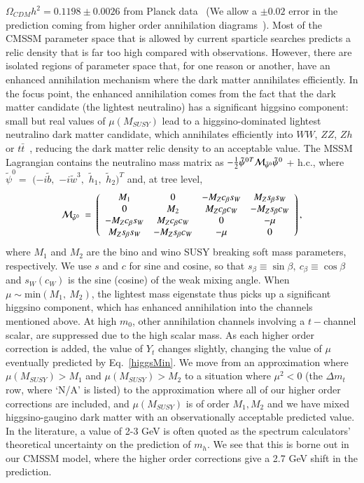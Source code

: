 \documentclass[final,3p,times,pdflatex]{elsarticle}
\begin{document}
$\Omega_{CDM} h^2=0.1198 \pm 0.0026$ from Planck data~\cite{Ade:2013zuv} (We
allow a $\pm 0.02$ error in the prediction coming from higher order
annihilation diagrams~\cite{Baro:2009na}).
Most of the CMSSM parameter space that is allowed by current sparticle
searches predicts a relic density that is far too high compared with
observations. However, there are isolated regions of parameter space that, for
one reason or another, have an enhanced annihilation mechanism where the dark
matter annihilates efficiently. In the focus point, the enhanced annihilation
comes from the fact that the dark matter candidate (the lightest neutralino)
has a significant higgsino component: small but real
values of $\mu(M_{SUSY})$ lead to a higgsino-dominated lightest neutralino dark
matter candidate, which annihilates efficiently into $WW$, $ZZ$, $Zh$ or $t
\bar t$~\cite{Feng:2000gh}, reducing the dark matter relic density to an
acceptable value. 
The MSSM Lagrangian contains the neutralino mass matrix as
$-\frac{1}{2}
{\tilde\psi^0}{}^T{\cal M}_{\tilde\psi^0}\tilde\psi^0$ + h.c., where
$\tilde\psi^0 =$ $(-i\tilde b,$ $-i\tilde w^3,$ $\tilde h_1,$ $\tilde
h_2)^T$ and, at tree level,
%
\begin{equation}
{\cal M}_{\tilde\psi^0} \ =\ \left(\begin{array}{cccc} M_1 & 0 &
-M_Zc_\beta s_W & M_Zs_\beta s_W \\ 0 & M_2 & M_Zc_\beta c_W &
-M_Zs_\beta c_W \\ -M_Zc_\beta s_W & M_Zc_\beta c_W & 0 & -\mu \\
M_Zs_\beta s_W & -M_Zs_\beta c_W & -\mu & 0
\end{array} \right),\label{mchi0}
\end{equation}
%
where $M_1$ and $M_2$ are the bino and wino SUSY breaking soft mass
parameters, respectively.
We use $s$ and $c$ for sine and cosine, so that
$s_\beta\equiv\sin\beta,\ c_{\beta}\equiv\cos\beta$ and $s_W (c_W)$ is
the sine (cosine) of the weak mixing angle. When $\mu \sim \text{min}(M_1,\
M_2)$, 
the lightest mass eigenstate thus picks up a significant higgsino component, 
which has enhanced annihilation into the channels mentioned above. At high
$m_0$, other annihilation channels involving a $t-$channel scalar, are 
suppressed due to the high scalar mass. 
As each higher order correction is added, the value of $Y_t$ changes slightly,
changing the value of $\mu$ eventually predicted by Eq.~\ref{higgsMin}. 
We move from an approximation where $\mu(M_{SUSY}) > M_1$ and $\mu(M_{SUSY}) >
M_2$ to a situation where $\mu^2<0$ (the $\Delta m_t$ row, where `N/A' is
listed) to the approximation where all of our higher order corrections are
included, and $\mu(M_{SUSY})$ is of order $M_1, M_2$ and we have mixed
higgsino-gaugino dark matter with an observationally acceptable predicted value.
In the literature,  a value of 2-3 GeV is often quoted as the spectrum
calculators' theoretical uncertainty on the prediction of $m_h$. We see that
this is borne out in our CMSSM model, where the higher order corrections give
a 2.7 GeV shift in the prediction.
\end{document}

